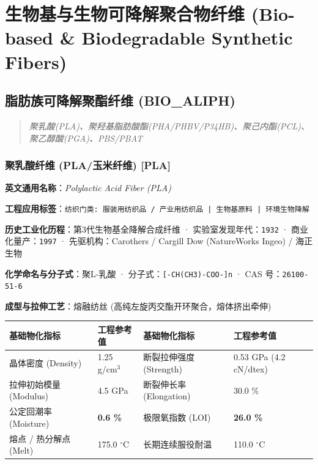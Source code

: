 \documentclass[11pt,openright,twoside,UTF8]{ctexbook}
\begin{document}
\part{生物基与生物可降解聚合物纤维 (Bio-based \& Biodegradable Synthetic Fibers)}

\chapter{脂肪族可降解聚酯纤维 (BIO\_ALIPH)}
\begin{quote}
\small\itshape
聚乳酸(PLA)、聚羟基脂肪酸酯(PHA/PHBV/P34HB)、聚己内酯(PCL)、聚乙醇酸(PGA)、PBS/PBAT
\end{quote}

\section{聚乳酸纤维 (PLA/玉米纤维) [PLA]}
\label{sec:pla}

\noindent\textbf{英文通用名称}：\textit{Polylactic Acid Fiber (PLA)}\par
\noindent\textbf{工程应用标签}：\texttt{纺织门类: 服装用纺织品 / 产业用纺织品 | 生物基原料 | 环境生物降解}\par
\noindent\textbf{历史工业化历程}：第3代生物基全降解合成纤维 · 实验室发现年代：\texttt{1932} · 商业化量产：\texttt{1997} · 先驱机构：Carothers / Cargill Dow (NatureWorks Ingeo) / 海正生物\par
\noindent\textbf{化学命名与分子式}：聚L-乳酸 · 分子式：\texttt{[-CH(CH3)-COO-]n} · CAS 号：\texttt{26100-51-6}\par
\noindent\textbf{成型与拉伸工艺}：熔融纺丝 (高纯左旋丙交酯开环聚合，熔体挤出牵伸)\par

\vspace{0.15cm}
\begin{center}
\small
\begin{tabularx}{\textwidth}{p{3.8cm}Xp{3.8cm}X}
\toprule
\textbf{基础物化指标} & \textbf{工程参考值} & \textbf{基础物化指标} & \textbf{工程参考值} \\
\midrule
晶体密度 (Density) & 1.25 g/cm$^3$ & 断裂拉伸强度 (Strength) & 0.53 GPa (4.2 cN/dtex) \\
拉伸初始模量 (Modulus) & 4.5 GPa & 断裂伸长率 (Elongation) & 30.0 \% \\
公定回潮率 (Moisture) & \textbf{0.6 \%} & 极限氧指数 (LOI) & \textbf{26.0 \%} \\
熔点 / 热分解点 (Melt) & 175.0 $^\circ\mathrm{C}$ & 长期连续服役耐温 & 110.0 $^\circ\mathrm{C}$ \\
\bottomrule
\end{tabularx}
\end{center}
\vspace{0.15cm}
\end{document}
